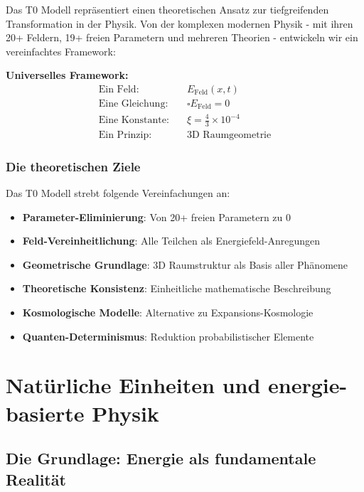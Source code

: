 	Das T0 Modell repräsentiert einen theoretischen Ansatz zur tiefgreifenden Transformation in der Physik. Von der komplexen modernen Physik - mit ihren 20+ Feldern, 19+ freien Parametern und mehreren Theorien - entwickeln wir ein vereinfachtes Framework:
	
	\begin{formel}
		\textbf{Universelles Framework:}
		\begin{align}
			\text{Ein Feld:} \quad &E_{\text{Feld}}(x,t) \\
			\text{Eine Gleichung:} \quad &\square E_{\text{Feld}} = 0 \\
			\text{Eine Konstante:} \quad &\xi = \frac{4}{3} \times 10^{-4} \\
			\text{Ein Prinzip:} \quad &\text{3D Raumgeometrie}
		\end{align}
	\end{formel}
	
	\subsection{Die theoretischen Ziele}
	
	Das T0 Modell strebt folgende Vereinfachungen an:
	
	\begin{itemize}
		\item \textbf{Parameter-Eliminierung}: Von 20+ freien Parametern zu 0
		\item \textbf{Feld-Vereinheitlichung}: Alle Teilchen als Energiefeld-Anregungen
		\item \textbf{Geometrische Grundlage}: 3D Raumstruktur als Basis aller Phänomene
		\item \textbf{Theoretische Konsistenz}: Einheitliche mathematische Beschreibung
		\item \textbf{Kosmologische Modelle}: Alternative zu Expansions-Kosmologie
		\item \textbf{Quanten-Determinismus}: Reduktion probabilistischer Elemente
	\end{itemize}
	
	\chapter{Natürliche Einheiten und energie-basierte Physik}
	
	\section{Die Grundlage: Energie als fundamentale Realität}
	
